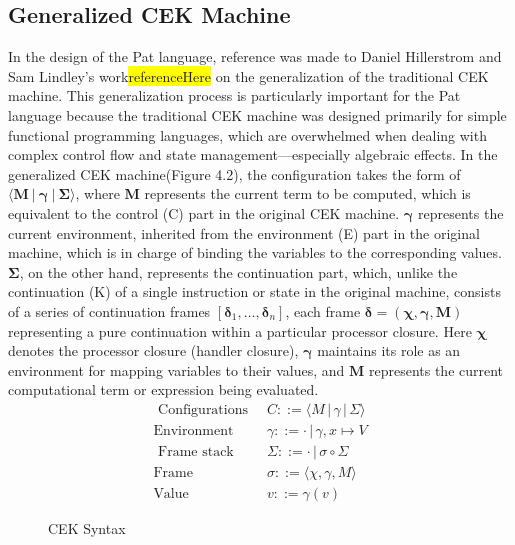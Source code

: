 \documentclass{l4proj}
\begin{document}
\subsection{Generalized CEK Machine}
In the design of the Pat language, reference was made to Daniel Hillerstrom and Sam Lindley's work\colorbox{yellow}{referenceHere} on the generalization of the traditional CEK machine. This generalization process is particularly important for the Pat language because the traditional CEK machine was designed primarily for simple functional programming languages, which are overwhelmed when dealing with complex control flow and state management---especially algebraic effects. In the generalized CEK machine(Figure 4.2), the configuration takes the form of $\langle \boldsymbol{M}\: |\: \boldsymbol{\gamma} \:| \:\boldsymbol{\Sigma} \rangle$, where $\boldsymbol{M}$ represents the current term to be computed, which is equivalent to the control (C) part in the original CEK machine. $\boldsymbol{\gamma}$ represents the current environment, inherited from the environment (E) part in the original machine, which is in charge of binding the variables to the corresponding values. $\boldsymbol{\Sigma}$, on the other hand, represents the continuation part, which, unlike the continuation (K) of a single instruction or state in the original machine, consists of a series of continuation frames $[\boldsymbol{\delta}_1, \ldots , \boldsymbol{\delta}_n]$, each frame $\boldsymbol{\delta} = (\boldsymbol{\chi}, \boldsymbol{\gamma}, \boldsymbol{M})$ representing a pure continuation within a particular processor closure. Here $\boldsymbol{\chi}$ denotes the processor closure (handler closure), $\boldsymbol{\gamma}$ maintains its role as an environment for mapping variables to their values, and $\boldsymbol{M}$ represents the current computational term or expression being evaluated. 
\begin{align*}
\text{ Configurations}\;\; & C ::= \langle M \, | \, \gamma \, | \, \Sigma \rangle \\
\text{Environment}\;\; & \gamma ::= \cdot \, | \, \gamma, x \mapsto V \\
\text{ Frame stack}\;\; & \Sigma ::= \cdot \, | \, \sigma \circ \Sigma \\
\text{Frame}\;\; & \sigma ::= \langle \chi, \gamma, M \rangle \\
\text{Value}\;\; & v ::= \gamma(v) 
\end{align*}
\vspace{-2\baselineskip} 
\begin{figure}[ht]
    \caption{CEK Syntax}
    \label{fig:equations}
\end{figure}
\end{document}
